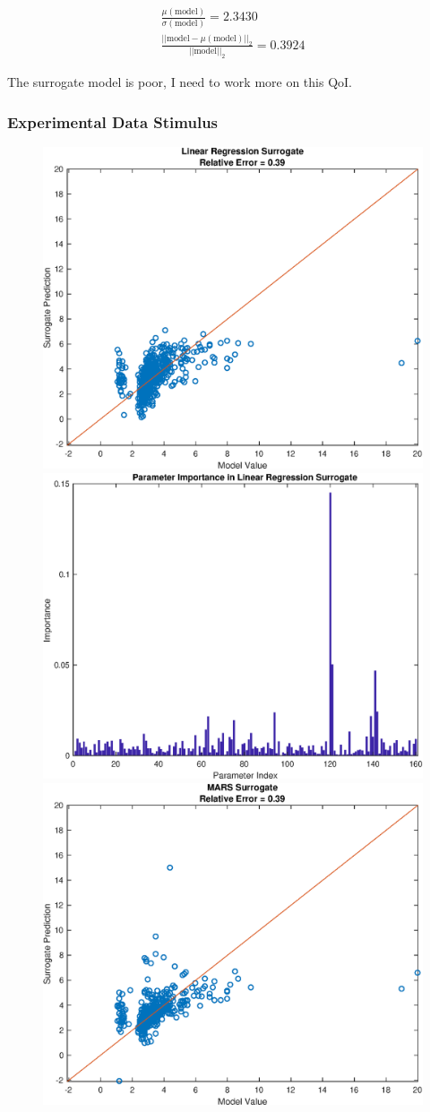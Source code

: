\documentclass[12pt]{article}
\numberwithin{equation}{section}
\begin{document}
\begin{eqnarray*}
\frac{\mu(\text{model})}{\sigma(\text{model})} = 2.3430\\
\frac{\vert \vert \text{model}-\mu(\text{model}) \vert \vert_2 }{\vert \vert \text{model}\vert \vert_2 } = 0.3924
\end{eqnarray*}

The surrogate model is poor, I need to work more on this QoI.

\newpage

\subsubsection{Experimental Data Stimulus}

\begin{figure}[h]
\centering
\includegraphics[width=.49 \textwidth]{Figures/AMp_Time_to_Min_QoI_LR_Prediction_Experimental.eps}
\includegraphics[width=.49 \textwidth]{Figures/AMp_Time_to_Min_QoI_LR_VI_Experimental.eps}\\
\includegraphics[width=.49 \textwidth]{Figures/AMp_Time_to_Min_QoI_MARS_Prediction_Experimental.eps}

\end{figure}
\end{document}
